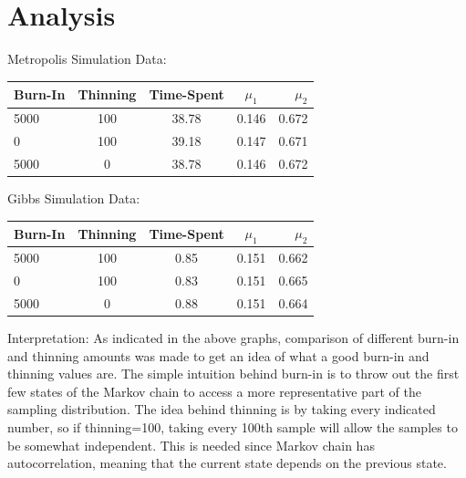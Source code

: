 \documentclass[11pt,a4paper]{article}
\begin{document}

\newpage


\section*{Analysis}

\begin{center}
Metropolis Simulation Data: \\ 
  \begin{tabular}{ | l | c | c | c | r | }
    \hline
    Burn-In & Thinning & Time-Spent & $\mu_{1}$ & $\mu_{2}$ \\ \hline
    5000 & 100 & 38.78 & 0.146 & 0.672 \\ \hline
    0 & 100 & 39.18 & 0.147 & 0.671 \\ \hline
    5000 & 0 & 38.78 & 0.146 & 0.672 \\ 
    \hline
  \end{tabular}
\end{center}

\begin{center}
Gibbs Simulation Data: \\
  \begin{tabular}{ | l | c | c | c | r | }
    \hline
    Burn-In & Thinning & Time-Spent & $\mu_{1}$ & $\mu_{2}$ \\ \hline
    5000 & 100 & 0.85 & 0.151 & 0.662 \\ \hline
    0 & 100 & 0.83 & 0.151 & 0.665\\ \hline
    5000 & 0 & 0.88 & 0.151 & 0.664 \\ 
    \hline
  \end{tabular}
\end{center}

Interpretation:
As indicated in the above graphs, comparison of different burn-in and thinning amounts was made to get an idea of what a good burn-in and thinning values are. The simple intuition behind burn-in is to throw out the first few states of the Markov chain to access a more representative part of the sampling distribution. The idea behind thinning is by taking every indicated number, so if thinning=100, taking every 100th sample will allow the samples to be somewhat independent. This is needed since Markov chain has autocorrelation, meaning that the current state depends on the previous state. \\
\end{document}
